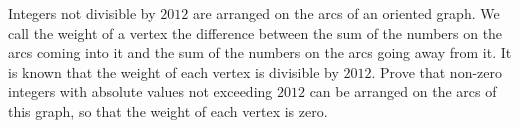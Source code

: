 Integers not divisible by $2012$ are arranged on the arcs of an oriented graph. We call the weight of a vertex the difference between the sum of the numbers on the arcs coming into it and the sum of the numbers on the arcs going away from it. It is known that the weight of each vertex is divisible by $2012$. Prove that non-zero integers with absolute values not exceeding $2012$ can be arranged on the arcs of this graph, so that the weight of each vertex is zero.